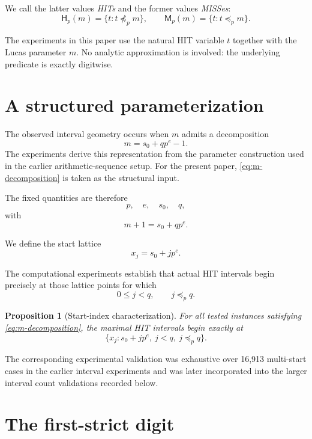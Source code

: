 \documentclass[11pt,a4paper]{article}
\newtheorem{proposition}[theorem]{Proposition}
\theoremstyle{definition}
\theoremstyle{remark}
\newcommand{\hit}{\mathsf{H}}
\newcommand{\miss}{\mathsf{M}}
\begin{document}
We call the latter values \emph{HITs} and the former values \emph{MISSes}:
\[
 \hit_p(m)=\{t: t\not\preceq_p m\},
 \qquad
 \miss_p(m)=\{t: t\preceq_p m\}.
\]

The experiments in this paper use the natural HIT variable $t$ together with the Lucas parameter $m$. No analytic approximation is involved: the underlying predicate is exactly digitwise.

\section{A structured parameterization}

The observed interval geometry occurs when $m$ admits a decomposition
\begin{equation}
 m=s_0+q p^e-1.
 \label{eq:m-decomposition}
\end{equation}
The experiments derive this representation from the parameter construction used in the earlier arithmetic-sequence setup.  For the present paper, \eqref{eq:m-decomposition} is taken as the structural input.

The fixed quantities are therefore
\[
 p,\quad e,\quad s_0,\quad q,
\]
with
\[
 m+1=s_0+qp^e.
\]

We define the start lattice
\begin{equation}
 x_j=s_0+jp^e.
 \label{eq:start-lattice}
\end{equation}

The computational experiments establish that actual HIT intervals begin precisely at those lattice points for which
\begin{equation}
 0\le j<q,
 \qquad
 j\preceq_p q.
 \label{eq:valid-start-indices}
\end{equation}

\begin{proposition}[Start-index characterization]
For all tested instances satisfying \eqref{eq:m-decomposition}, the maximal HIT intervals begin exactly at
\[
 \{x_j:s_0+jp^e,\ j<q,\ j\preceq_p q\}.
\]
\end{proposition}

The corresponding experimental validation was exhaustive over 16,913 multi-start cases in the earlier interval experiments and was later incorporated into the larger interval count validations recorded below.

\section{The first-strict digit}
\end{document}
